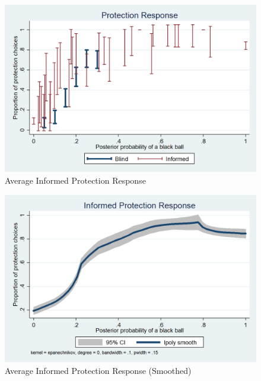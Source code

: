 \documentclass[11pt,a4paper]{article}
\begin{document}
\begin{figure}[H]
\centering
\caption{Average Informed Protection Response} \label{Informed Protection Responses}

  \includegraphics[scale=0.3]{Graphs/ip_response_comp.png}

\end{figure}


\begin{figure}[H]
\centering
\caption{Average Informed Protection Response (Smoothed)} \label{Informed Protection Responses}

  \centering
  \includegraphics[scale=0.3]{Graphs/ip_response_lpoly.png}

\end{figure}
\end{document}
